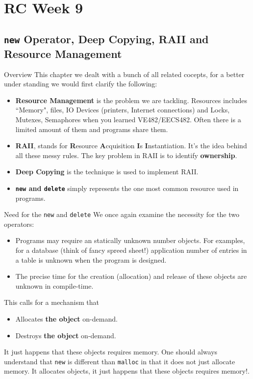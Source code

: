 \section{RC Week 9}
\subsection{\texttt{new} Operator, Deep Copying, RAII and Resource Management}

\begin{frame}{Overview}
This chapter we dealt with a bunch of all related cocepts, for a better under standing we would first clarify the following:
\begin{itemize}
    \item \textbf{Resource Management} is the problem we are tackling. Resources includes ``Memory", files, IO Devices (printers, Internet connections) and Locks, Mutexes, Semaphores when you learned VE482/EECS482. Often there is a limited amount of them and programs share them.
    \item \textbf{RAII}, stands for \textbf{R}esource \textbf{A}cquisition  \textbf{I}s \textbf{I}nstantiation. It's the idea behind all these messy rules. The key problem in RAII is to identify \textbf{ownership}. 
    \item \textbf{Deep Copying} is the technique is used to implement RAII.
    \item \textbf{\texttt{new} and \texttt{delete}} simply represents the one most common resource used in programs.
\end{itemize}
\end{frame}

\begin{frame}{Need for the \texttt{new} and \texttt{delete}}
We once again examine the necessity for the two operators:
\begin{itemize}
    \item Programs may require an statically unknown number objects. For examples, for a database (think of fancy spreed sheet!) application number of entries in a table is unknown when the program is designed.
    \item The precise time for the creation (allocation) and release of these objects are unknown in compile-time.
\end{itemize}
This calls for a mechanism that
\begin{itemize}
    \item Allocates \textbf{the object} on-demand.
    \item Destroys \textbf{the object} on-demand.
\end{itemize}
It just happens that these objects requires memory. One should always understand that \texttt{new} is different than \texttt{malloc} in that it does not just allocate memory. \alert{It allocates objects, it just happens that these objects requires memory!.}
\end{frame}

